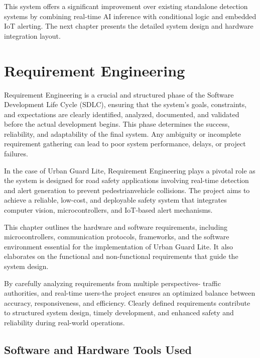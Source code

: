 \documentclass[a4paper, 12pt]{report}
\begin{document}
This system offers a significant improvement over existing standalone detection systems by combining real-time AI inference with conditional logic and embedded IoT alerting. The next chapter presents the detailed system design and hardware integration layout.

\chapter{Requirement Engineering}

Requirement Engineering is a crucial and structured phase of the Software Development Life Cycle (SDLC), ensuring that the system’s goals, constraints, and expectations are clearly identified, analyzed, documented, and validated before the actual development begins. This phase determines the success, reliability, and adaptability of the final system. Any ambiguity or incomplete requirement gathering can lead to poor system performance, delays, or project failures.

In the case of Urban Guard Lite, Requirement Engineering plays a pivotal role as the system is designed for road safety applications involving real-time detection and alert generation to prevent pedestrianvehicle collisions. The project aims to achieve a reliable, low-cost, and deployable safety system that integrates computer vision, microcontrollers, and IoT-based alert mechanisms.

This chapter outlines the hardware and software requirements, including microcontrollers, communication protocols, frameworks, and the software environment essential for the implementation of Urban Guard Lite. It also elaborates on the functional and non-functional requirements that guide the system design.

By carefully analyzing requirements from multiple perspectives- traffic authorities, and real-time users-the project ensures an optimized balance between accuracy, responsiveness, and efficiency. Clearly defined requirements contribute to structured system design, timely development, and enhanced safety and reliability during real-world operations.


\section{Software and Hardware Tools Used}
\end{document}
